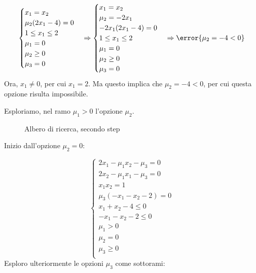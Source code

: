 \documentclass[\main/main.tex]{subfiles}
\begin{document}
\[
  \begin{cases}
    x_1 = x_2           \\
    \mu_2 (2x_1 -4) = 0 \\
    1 \leq x_1 \leq 2   \\
    \mu_1 = 0           \\
    \mu_2 \geq 0        \\
    \mu_3 = 0           \\
  \end{cases}
  \Rightarrow
  \begin{cases}
    x_1 = x_2           \\
    \mu_2 = -2x_1       \\
    -2x_1 (2x_1 -4) = 0 \\
    1 \leq x_1 \leq 2   \\
    \mu_1 = 0           \\
    \mu_2 \geq 0        \\
    \mu_3 = 0           \\
  \end{cases}
  \Rightarrow
  \error{\mu_2 = -4 < 0}
\]
Ora, $x_1 \neq 0$, per cui $x_1 = 2$. Ma questo implica che $\mu_2 = -4 < 0$, per cui questa opzione risulta impossibile.

Esploriamo, nel ramo $\mu_1 > 0$ l'opzione $\mu_2$.

\begin{figure}
  \caption{Albero di ricerca, secondo step}
\end{figure}

Inizio dall'opzione $\mu_2=0$:

\[
  \begin{cases}
    2x_1-\mu_1x_2  - \mu_3 = 0 \\
    2x_2-\mu_1x_1  - \mu_3 = 0 \\
    x_1x_2 = 1                 \\
    \mu_3 (-x_1 - x_2 - 2) = 0 \\
    x_1 + x_2 -4 \leq 0        \\
    -x_1 - x_2 - 2 \leq 0      \\
    \mu_1 > 0                  \\
    \mu_2 = 0                  \\
    \mu_3 \geq 0               \\
  \end{cases}
\]
Esploro ulteriormente le opzioni $\mu_3$ come sottorami:
\end{document}
